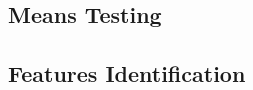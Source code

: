 \subsection{Means Testing}
\label{subsec:meansTesting}

\subsection{Features Identification}
\label{subsec:featuresIdentification}
